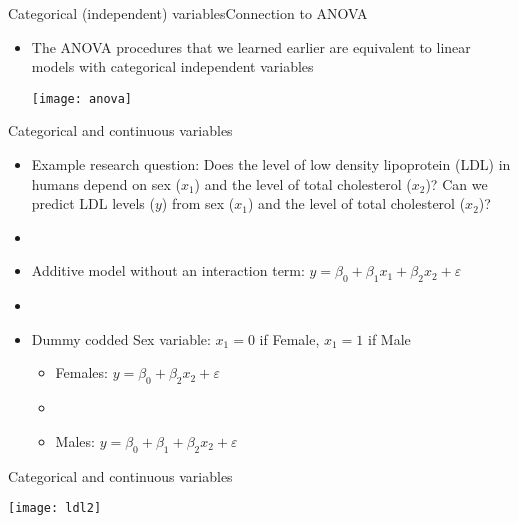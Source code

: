 \documentclass[xcolor=dvipsnames]{beamer}
\begin{document}
\begin{frame}{Categorical (independent) variables}{Connection to ANOVA}
	\begin{itemize}
		\item The ANOVA procedures that we learned earlier are equivalent to linear models with categorical independent variables \pause
\vspace{3mm}
		\begin{center}
			\texttt{[image: anova]}
		\end{center}
	\end{itemize}
\end{frame}

\begin{frame}{Categorical and continuous variables}
	\begin{itemize}
		\item Example research question: Does the level of low density lipoprotein (LDL) in humans depend on sex ($x_1$) and the level of total cholesterol ($x_2$)? Can we predict LDL levels ($y$) from sex ($x_1$) and the level of total cholesterol ($x_2$)? \pause
		\item[]
		\item Additive model without an interaction term: $y = \beta_0 + \beta_1 x_1 + \beta_2 x_2 + \varepsilon $ \pause
		\item[]
		\item Dummy codded Sex variable: $x_1 = 0$ if Female, $x_1 = 1$ if Male \pause
		\begin{itemize}
			\item Females: $y = \beta_0 + \beta_2 x_2 + \varepsilon $ \pause
			\item[]
			\item Males: $y = \beta_0 + \beta_1 + \beta_2 x_2 + \varepsilon $
		\end{itemize}
	\end{itemize}
\end{frame}

\begin{frame}{Categorical and continuous variables}
	\begin{center}
		\texttt{[image: ldl2]}
	\end{center}
\end{frame}
\end{document}
